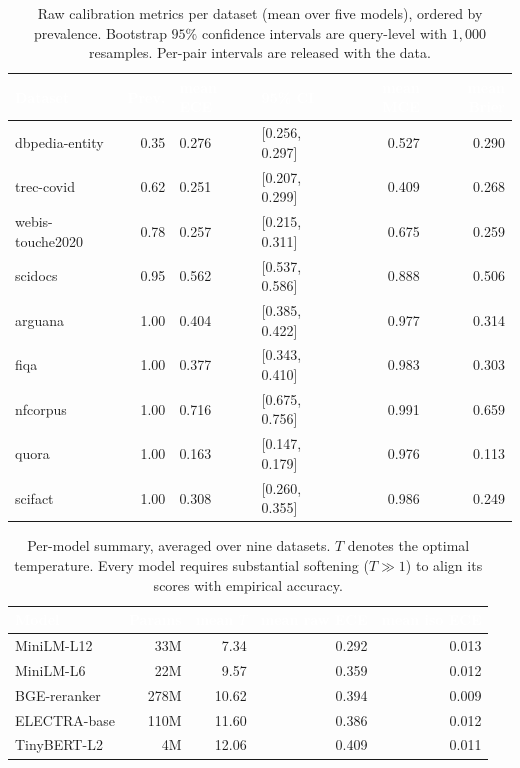 \documentclass[sn-mathphys-num,pdflatex]{sn-jnl}
\newcommand{\thead}[1]{\textcolor{white}{\textbf{#1}}}
\begin{document}
\begin{table}[t]
\centering
\caption{Raw calibration metrics per dataset (mean over five models), ordered by
prevalence. Bootstrap $95\%$ confidence intervals are query-level with $1{,}000$
resamples. Per-pair intervals are released with the data.}\label{tab:raw}
\small
\begin{tabular}{lrllrr}
\toprule
\rowcolor{headblue}
\thead{Dataset} & \thead{Prev.} & \thead{mean ECE} & \thead{95\% CI} & \thead{mean MCE} & \thead{mean Brier} \\
\midrule
\rowcolor{cleangreen}
dbpedia-entity   & 0.35 & 0.276 & [0.256, 0.297] & 0.527 & 0.290 \\
\rowcolor{cleangreen}
trec-covid       & 0.62 & 0.251 & [0.207, 0.299] & 0.409 & 0.268 \\
\rowcolor{cleangreen}
webis-touche2020 & 0.78 & 0.257 & [0.215, 0.311] & 0.675 & 0.259 \\
\rowcolor{cleangreen}
scidocs          & 0.95 & 0.562 & [0.537, 0.586] & 0.888 & 0.506 \\
\rowcolor{singleclasspink}
arguana          & 1.00 & 0.404 & [0.385, 0.422] & 0.977 & 0.314 \\
\rowcolor{singleclasspink}
fiqa             & 1.00 & 0.377 & [0.343, 0.410] & 0.983 & 0.303 \\
\rowcolor{singleclasspink}
nfcorpus         & 1.00 & 0.716 & [0.675, 0.756] & 0.991 & 0.659 \\
\rowcolor{singleclasspink}
quora            & 1.00 & 0.163 & [0.147, 0.179] & 0.976 & 0.113 \\
\rowcolor{singleclasspink}
scifact          & 1.00 & 0.308 & [0.260, 0.355] & 0.986 & 0.249 \\
\bottomrule
\end{tabular}
\end{table}

\begin{table}[t]
\centering
\caption{Per-model summary, averaged over nine datasets. $T$ denotes the optimal
temperature. Every model requires substantial softening ($T \gg 1$) to align its
scores with empirical accuracy.}\label{tab:permodel}
\small
\begin{tabular}{lrrrr}
\toprule
\rowcolor{headblue}
\thead{Model} & \thead{Params} & \thead{mean $T$} & \thead{mean raw ECE} & \thead{mean iso ECE} \\
\midrule
\rowcolor{rowlight}
MiniLM-L12   & 33M  & 7.34  & 0.292 & 0.013 \\
\rowcolor{rowwhite}
MiniLM-L6    & 22M  & 9.57  & 0.359 & 0.012 \\
\rowcolor{rowlight}
BGE-reranker & 278M & 10.62 & 0.394 & 0.009 \\
\rowcolor{rowwhite}
ELECTRA-base & 110M & 11.60 & 0.386 & 0.012 \\
\rowcolor{rowlight}
TinyBERT-L2  & 4M   & 12.06 & 0.409 & 0.011 \\
\bottomrule
\end{tabular}
\end{table}
\end{document}
